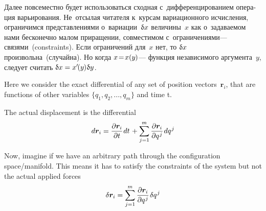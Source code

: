 

\begin{otherlanguage}{russian}

Далее повсеместно будет использоваться сходная с~дифференцированием операция варьирования. Не~отсылая читателя к~курсам вариационного исчисления, ограничимся представлениями о~вариации~${\updelta\hspace{-0.1ex}x}$ величины~$x$ как о~задаваемом нами бесконечно малом приращении, совместимом с~ограничениями\:--- связями~(constraints). Если ограничений для~$x$ нет, то ${\updelta\hspace{-0.1ex}x}$ произвольна~(случайна). Но когда ${x \!=\! x(y\hspace{-0.1ex})}$\:--- функция независимого аргумента~$y$, следует считать ${\updelta\hspace{-0.1ex}x = x'\hspace{-0.25ex}(y\hspace{-0.1ex}) \hspace{0.1ex} \updelta\hspace{-0.1ex}y}$.



{\small
\setlength{\abovedisplayskip}{2pt}\setlength{\belowdisplayskip}{2pt}

Here we consider the exact differential of any set of position vectors~$\bm{r}_i$, that are functions of other variables ${\displaystyle \lbrace q_{1},q_{2},...,q_{m}\rbrace }$ and time t.

The actual displacement is the differential
\[\displaystyle d\bm{r}_{i} = \frac{\partial \bm{r}_{i}}{\partial t} \hspace{.16ex} dt \hspace{.2ex} + \sum_{j=1}^{m} {\frac{\partial \bm{r}_{i}}{\partial q^{\hspace{.1ex}j}}} \hspace{.2ex} dq^{\hspace{.1ex}j}\]

Now, imagine if we have an arbitrary path through the configuration space/manifold. This means it has to satisfy the constraints of the system but not the actual applied forces
\[\displaystyle \delta \bm{r}_{i}=\sum _{j=1}^{m} {\frac {\partial \bm{r}_{i}}{\partial q^{\hspace{.1ex}j}}} \hspace{.2ex} \delta q^{\hspace{.1ex}j}\]

}
\end{otherlanguage}
